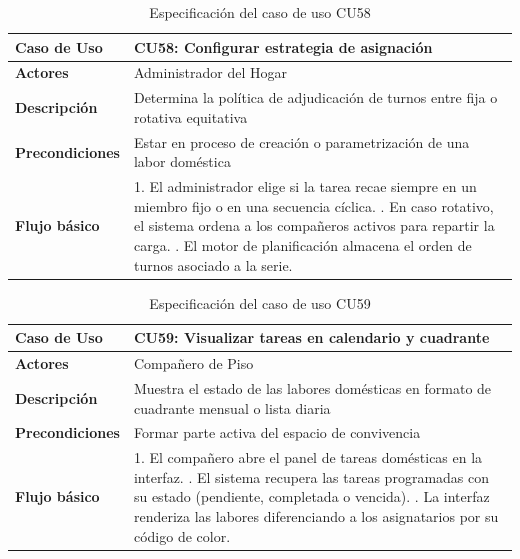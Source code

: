 \begin{table}[H]
\centering
\begin{tabular}{|p{3.2cm}|p{11.3cm}|}
\hline
\textbf{Caso de Uso} & \textbf{CU58: Configurar estrategia de asignación} \\ \hline
\textbf{Actores} & Administrador del Hogar \\ \hline
\textbf{Descripción} & Determina la política de adjudicación de turnos entre fija o rotativa equitativa \\ \hline
\textbf{Precondiciones} & Estar en proceso de creación o parametrización de una labor doméstica \\ \hline
\textbf{Flujo básico} & 
1. El administrador elige si la tarea recae siempre en un miembro fijo o en una secuencia cíclica. \newline
2. En caso rotativo, el sistema ordena a los compañeros activos para repartir la carga. \newline
3. El motor de planificación almacena el orden de turnos asociado a la serie. \\ \hline
\end{tabular}
\caption{Especificación del caso de uso CU58}
\label{tab:cu58}
\end{table}

\begin{table}[H]
\centering
\begin{tabular}{|p{3.2cm}|p{11.3cm}|}
\hline
\textbf{Caso de Uso} & \textbf{CU59: Visualizar tareas en calendario y cuadrante} \\ \hline
\textbf{Actores} & Compañero de Piso \\ \hline
\textbf{Descripción} & Muestra el estado de las labores domésticas en formato de cuadrante mensual o lista diaria \\ \hline
\textbf{Precondiciones} & Formar parte activa del espacio de convivencia \\ \hline
\textbf{Flujo básico} & 
1. El compañero abre el panel de tareas domésticas en la interfaz. \newline
2. El sistema recupera las tareas programadas con su estado (pendiente, completada o vencida). \newline
3. La interfaz renderiza las labores diferenciando a los asignatarios por su código de color. \\ \hline
\end{tabular}
\caption{Especificación del caso de uso CU59}
\label{tab:cu59}
\end{table}

